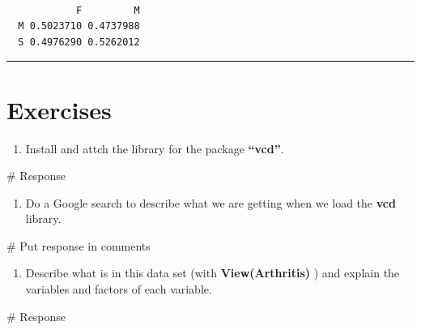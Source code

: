 \documentclass[
  letterpaper,
  DIV=11,
  numbers=noendperiod]{scrreprt}
\newenvironment{Shaded}{\begin{snugshade}}{\end{snugshade}}
\newcommand{\CommentTok}[1]{\textcolor[rgb]{0.37,0.37,0.37}{#1}}
\providecommand{\tightlist}{%
  \setlength{\itemsep}{0pt}\setlength{\parskip}{0pt}}\usepackage{longtable,booktabs,array}
\begin{document}
\begin{verbatim}
   
            F         M
  M 0.5023710 0.4737988
  S 0.4976290 0.5262012
\end{verbatim}

\begin{center}\rule{0.5\linewidth}{0.5pt}\end{center}

\section*{Exercises}\label{exercises-2}


\begin{enumerate}
\def\labelenumi{\arabic{enumi}.}
\tightlist
\item
  Install and attch the library for the package \textbf{``vcd''}.
\end{enumerate}

\begin{Shaded}
\begin{Highlighting}[]
\CommentTok{\# Response}
\end{Highlighting}
\end{Shaded}

\begin{enumerate}
\def\labelenumi{\arabic{enumi}.}
\setcounter{enumi}{1}
\tightlist
\item
  Do a Google search to describe what we are getting when we load the
  \textbf{vcd} library.
\end{enumerate}

\begin{Shaded}
\begin{Highlighting}[]
\CommentTok{\# Put response in comments}
\end{Highlighting}
\end{Shaded}

\begin{enumerate}
\def\labelenumi{\arabic{enumi}.}
\setcounter{enumi}{2}
\tightlist
\item
  Describe what is in this data set (with \textbf{View(Arthritis)} ) and
  explain the variables and factors of each variable.
\end{enumerate}

\begin{Shaded}
\begin{Highlighting}[]
\CommentTok{\# Response}
\end{Highlighting}
\end{Shaded}
\end{document}
